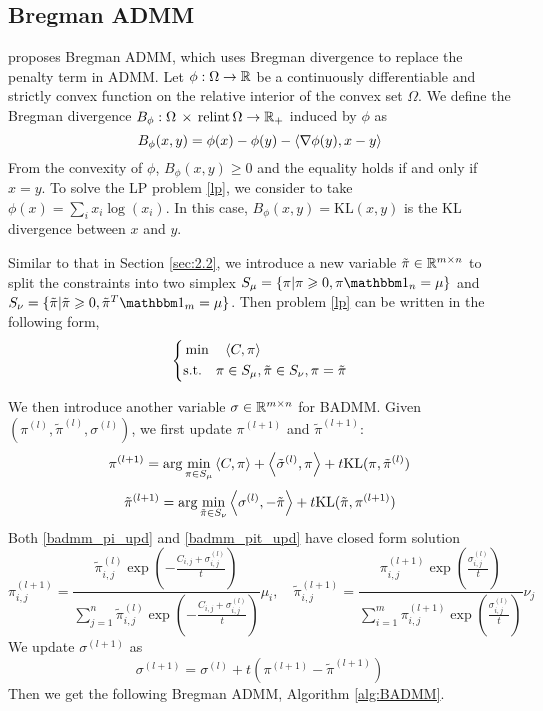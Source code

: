 \documentclass[english]{pkupaper}
\begin{document}
\subsection{Bregman ADMM}
\cite{BADMM} proposes Bregman ADMM, which uses Bregman divergence to replace the penalty term in ADMM. Let $\phi: \Omega \to \mathbb{R}$ be a continuously differentiable and strictly convex function on the relative interior of the convex set $\Omega$. We define the Bregman divergence $B_\phi:\Omega\,\times \,\mathrm{relint} \, \Omega\to\mathbb{R}_+$ induced by $\phi$ as
\begin{equation}
B_\phi(x,y)=\phi(x)-\phi(y)-\left\langle\nabla \phi(y),x-y\right\rangle
\end{equation}
From the convexity of $\phi$, $B_\phi(x,y)\geqslant 0$ and the equality holds if and only if $x=y$. To solve the LP problem \ref{lp}, we consider to take $\phi(x)=\sum_{i}x_i\log(x_i)$. In this case, $B_\phi(x,y)=\mathrm{KL}(x,y)$ is the KL divergence between $x$ and $y$.

Similar to that in Section \ref{sec:2.2}, we introduce a new variable $\tilde \pi\in\mathbb{R}^{m\times n}$ to split the constraints into two simplex $S_\mu=\{\pi|\pi\geqslant0, \pi\mbone_n = \mu\}$ and $S_\nu=\{\tilde \pi |\tilde \pi\geqslant 0, \tilde \pi^T\mbone_m = \mu\}$. Then problem \ref{lp} can be written in the following form,
\begin{equation}
\left\{
\begin{aligned}
&\min\quad \left\langle C, \pi\right\rangle\\
&\mathrm{s.t.}\quad \pi\in S_\mu, \tilde \pi\in S_\nu, \pi=\tilde \pi
\end{aligned}
\right.
\end{equation}

We then introduce another variable $\sigma\in\mathbb{R}^{m\times n}$ for BADMM. Given $(\pi^{(l)},\tilde\pi^{(l)},\sigma^{(l)})$, we first update $\pi^{(l+1)}$ and $\tilde\pi^{(l+1)}$:
\begin{equation}
\label{badmm_pi_upd}
\pi^{(l+1)}=\arg\min\limits_{\pi\in S_\mu} \left\langle C, \pi\right\rangle+\left\langle \tilde \sigma^{(l)}, \pi\right\rangle+t \mathrm{KL}(\pi,\tilde\pi^{(l)})
\end{equation}
\begin{equation}
\label{badmm_pit_upd}
\tilde\pi^{(l+1)}=\arg\min\limits_{\tilde\pi\in S_\nu} \left\langle \sigma^{(l)}, -\tilde\pi\right\rangle+t \mathrm{KL}(\tilde\pi, \pi^{(l+1)})
\end{equation}
Both \ref{badmm_pi_upd} and \ref{badmm_pit_upd} have closed form solution
\begin{equation}
\label{badmm_pipit_upd}
\pi_{i,j}^{(l+1)}=\frac{\tilde\pi^{(l)}_{i,j}\exp(-\frac{C_{i,j}+\sigma_{i,j}^{(l)}}{t})}{\sum_{j=1}^n\tilde\pi^{(l)}_{i,j}\exp(-\frac{C_{i,j}+\sigma_{i,j}^{(l)}}{t})}\mu_i, \quad \tilde\pi_{i,j}^{(l+1)}=\frac{\pi_{i,j}^{(l+1)}\exp(\frac{\sigma_{i,j}^{(l)}}{t})}{\sum_{i=1}^m\pi_{i,j}^{(l+1)}\exp(\frac{\sigma_{i,j}^{(l)}}{t})}\nu_j
\end{equation}
We update $\sigma^{(l+1)}$ as
\begin{equation}
\label{badmm_sigma_upd}
\sigma^{(l+1)} = \sigma^{(l)} + t (\pi^{(l+1)}-\tilde\pi^{(l+1)})
\end{equation}
Then we get the following Bregman ADMM, Algorithm \ref{alg:BADMM}.
\end{document}
